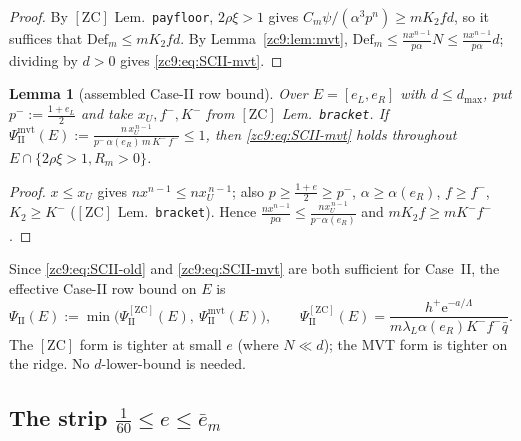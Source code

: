 \documentclass[11pt]{amsart}
\newtheorem{lemma}[theorem]{Lemma}
\newcommand{\eu}{\mathrm{e}}
\newcommand{\Def}{\mathrm{Def}}
\newcommand{\ZC}{[\textrm{ZC}]}
\begin{document}
\begin{proof}
By $\ZC$ Lem.~\texttt{payfloor}, $2\rho\xi>1$ gives
$C_m\psi/(\alpha^3p^{n})\ge mK_2fd$, so it suffices that $\Def_m\le mK_2fd$.  By
Lemma~\ref{zc9:lem:mvt}, $\Def_m\le\tfrac{n x^{n-1}}{p\alpha}N\le
\tfrac{n x^{n-1}}{p\alpha}d$; dividing by $d>0$ gives \eqref{zc9:eq:SCII-mvt}.
\end{proof}

\begin{lemma}[assembled Case-II row bound]\label{zc9:lem:mvtrow}
Over $E=[e_L,e_R]$ with $d\le d_{\max}$, put $p^-:=\tfrac{1+e_L}2$ and take
$x_U,f^-,K^-$ from $\ZC$ Lem.~\texttt{bracket}.  If
$\Psi_{\mathrm{II}}^{\mathrm{mvt}}(E):=\tfrac{n\,x_U^{\,n-1}}{p^-\,\alpha(e_R)\,m\,K^-\,f^-}\le1$,
then \eqref{zc9:eq:SCII-mvt} holds throughout $E\cap\{2\rho\xi>1,R_m>0\}$.
\end{lemma}

\begin{proof}
$x\le x_U$ gives $nx^{n-1}\le nx_U^{\,n-1}$; also $p\ge\tfrac{1+e}2\ge p^-$,
$\alpha\ge\alpha(e_R)$, $f\ge f^-$, $K_2\ge K^-$ ($\ZC$ Lem.~\texttt{bracket}).
Hence $\tfrac{n x^{n-1}}{p\alpha}\le\tfrac{n x_U^{\,n-1}}{p^-\alpha(e_R)}$ and
$mK_2f\ge mK^-f^-$.
\end{proof}

Since \eqref{zc9:eq:SCII-old} and \eqref{zc9:eq:SCII-mvt} are both sufficient
for Case~II, the effective Case-II row bound on $E$ is
\begin{equation}\label{zc9:eq:PsiII}
 \Psi_{\mathrm{II}}(E):=\min\bigl(\Psi_{\mathrm{II}}^{\mathrm{[ZC]}}(E),\
 \Psi_{\mathrm{II}}^{\mathrm{mvt}}(E)\bigr),\qquad
 \Psi_{\mathrm{II}}^{\mathrm{[ZC]}}(E)=\frac{h^+\eu^{-a/\Lambda}}
 {m\lambda_L\alpha(e_R)K^-f^-\bar q}.
\end{equation}
The $\ZC$ form is tighter at small $e$ (where $N\ll d$); the MVT form is tighter
on the ridge.  No $d$-lower-bound is needed.

\subsection{The strip $\tfrac1{60}\le e\le\bar e_m$}\label{zc9:sec:strip}
\end{document}
